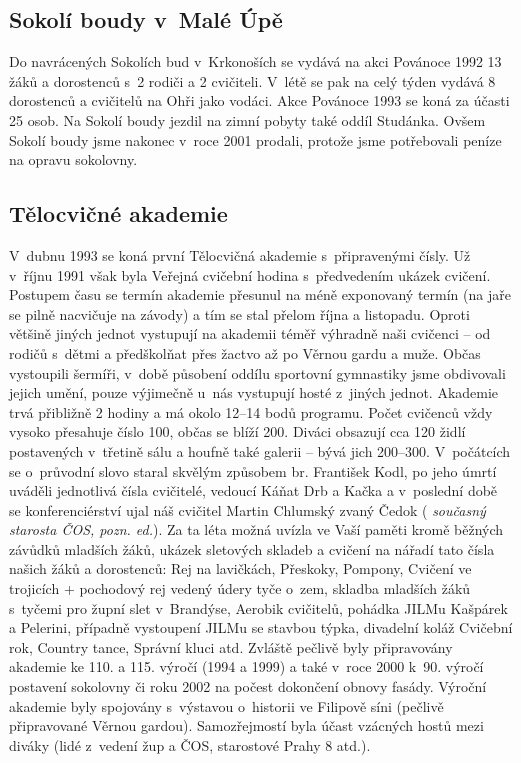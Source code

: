 \documentclass[a5paper, 11pt, twoside]{article}
\newcommand{\pozned}[1]{%
\textit{#1}}
\begin{document}
\subsection{Sokolí boudy v~Malé Úpě}

Do navrácených Sokolích bud v~Krkonoších se vydává na akci Povánoce 1992
13 žáků a dorostenců s~2 rodiči a 2 cvičiteli. V~létě se pak na celý
týden vydává 8 dorostenců a cvičitelů na Ohři jako vodáci. Akce Povánoce
1993 se koná za účasti 25 osob. Na Sokolí boudy jezdil na zimní pobyty
také oddíl Studánka. Ovšem Sokolí boudy jsme nakonec v~roce 2001
prodali, protože jsme potřebovali peníze na opravu sokolovny.

\subsection{Tělocvičné akademie}

V~dubnu 1993 se koná první Tělocvičná akademie s~připravenými čísly. Už
v~říjnu 1991 však byla Veřejná cvičební hodina s~předvedením ukázek
cvičení. Postupem času se termín akademie přesunul na méně exponovaný
termín (na jaře se pilně nacvičuje na závody) a tím se stal přelom října
a listopadu. Oproti většině jiných jednot vystupují na akademii téměř
výhradně naši cvičenci -- od rodičů s~dětmi a předškolňat přes žactvo až
po Věrnou gardu a muže. Občas vystoupili šermíři, v~době působení oddílu
sportovní gymnastiky jsme obdivovali jejich umění, pouze výjimečně u~nás
vystupují hosté z~jiných jednot. Akademie trvá přibližně 2 hodiny a má
okolo 12--14 bodů programu. Počet cvičenců vždy vysoko přesahuje číslo
100, občas se blíží 200. Diváci obsazují cca 120 židlí postavených
v~třetině sálu a houfně také galerii -- bývá jich 200--300. V~počátcích se
o~průvodní slovo staral skvělým způsobem br. František Kodl, po jeho
úmrtí uváděli jednotlivá čísla cvičitelé, vedoucí Káňat Drb a Kačka a
v~poslední době se konferenciérství ujal náš cvičitel Martin Chlumský
zvaný Čedok (\pozned{současný starosta ČOS, pozn. ed.}). Za ta léta možná
uvízla ve Vaší paměti kromě běžných závůdků mladších žáků, ukázek
sletových skladeb a cvičení na nářadí tato čísla našich žáků a
dorostenců: Rej na lavičkách, Přeskoky, Pompony, Cvičení ve trojicích +
pochodový rej vedený údery tyče o~zem, skladba mladších žáků s~tyčemi
pro župní slet v~Brandýse, Aerobik cvičitelů, pohádka JILMu Kašpárek a
Pelerini, případně vystoupení JILMu se stavbou týpka, divadelní koláž
Cvičební rok, Country tance, Správní kluci atd. Zvláště pečlivě byly
připravovány akademie ke 110. a 115. výročí (1994 a 1999) a také v~roce
2000 k~90. výročí postavení sokolovny či roku 2002 na počest dokončení
obnovy fasády. Výroční akademie byly spojovány s~výstavou o~historii ve
Filipově síni (pečlivě připravované Věrnou gardou). Samozřejmostí byla
účast vzácných hostů mezi diváky (lidé z~vedení žup a ČOS, starostové
Prahy 8 atd.).
\end{document}
